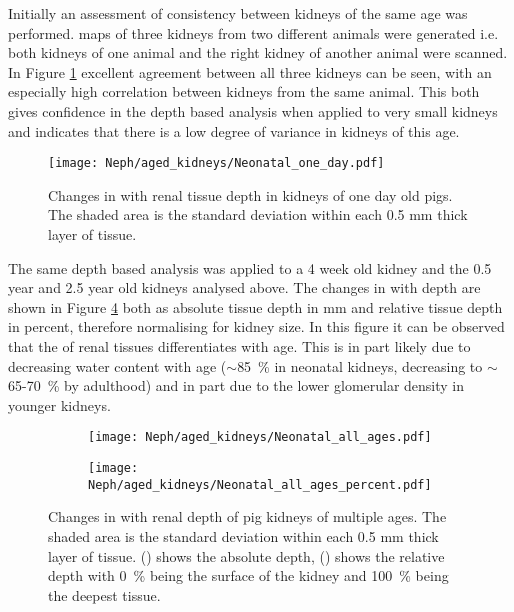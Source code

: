 Initially an assessment of consistency between kidneys of the same age was performed. \tone maps of three kidneys from two different animals were generated i.e. both kidneys of one animal and the right kidney of another animal were scanned. In Figure \ref{fig:ex_neo_layers_one_day} excellent agreement between all three kidneys can be seen, with an especially high correlation between kidneys from the same animal. This both gives confidence in the depth based analysis when applied to very small kidneys and indicates that there is a low degree of variance in kidneys of this age.

\begin{figure}[H]
	\centering
	\texttt{[image: Neph/aged\_kidneys/Neonatal\_one\_day.pdf]}
	\caption{Changes in \tone with renal tissue depth in kidneys of one day old pigs. The shaded area is the standard deviation within each 0.5 mm thick layer of tissue.}
	\label{fig:ex_neo_layers_one_day}	
\end{figure}

The same depth based analysis was applied to a 4 week old kidney and the 0.5 year and 2.5 year old kidneys analysed above. The changes in \tone with depth are shown in Figure \ref{fig:ex_neo_layers_all_ages} both as absolute tissue depth in mm and relative tissue depth in percent, therefore normalising for kidney size. In this figure it can be observed that the \tone of renal tissues differentiates with age. This is in part likely due to decreasing water content with age ($\sim$85~\% in neonatal kidneys, decreasing to $\sim$65-70~\% by adulthood) and in part due to the lower glomerular density in younger kidneys.

\begin{figure}[H]
	\centering
	\begin{subfigure}[c]{0.47\textwidth}
		\centering
		\texttt{[image: Neph/aged\_kidneys/Neonatal\_all\_ages.pdf]}
		\caption{}
		\label{fig:ex_neo_layers_all_ages_abs}
	\end{subfigure}
	\hfill
	\begin{subfigure}[c]{0.47\textwidth}
		\centering
		\texttt{[image: Neph/aged\_kidneys/Neonatal\_all\_ages\_percent.pdf]}
		\caption{}
		\label{fig:ex_neo_layers_all_ages_per}
	\end{subfigure}
	\caption{Changes in \tone with renal depth of pig kidneys of multiple ages. The shaded area is the standard deviation within each 0.5 mm thick layer of tissue. () shows the absolute depth, () shows the relative depth with 0~\% being the surface of the kidney and 100~\% being the deepest tissue.}
	\label{fig:ex_neo_layers_all_ages}
\end{figure}

